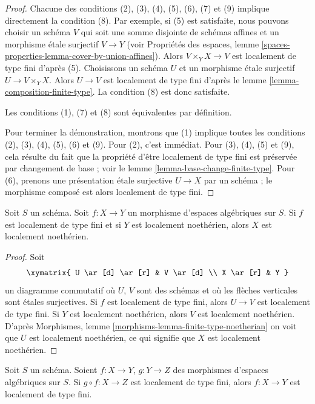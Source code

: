 \begin{proof}
Chacune des conditions (2), (3), (4), (5), (6), (7) et (9)
implique directement la condition (8). Par exemple, si
(5) est satisfaite, nous pouvons choisir un schéma $V$ qui soit une somme
disjointe de schémas affines et un morphisme étale surjectif $V \to Y$
(voir Propriétés des espaces, lemme
\ref{spaces-properties-lemma-cover-by-union-affines}).
Alors $V \times_Y X \to V$ est localement de type fini d'après (5).
Choisissons un schéma $U$ et un morphisme étale surjectif
$U \to V \times_Y X$. Alors $U \to V$ est localement de type
fini d'après le lemme \ref{lemma-composition-finite-type}.
La condition (8) est donc satisfaite.

\medskip\noindent
Les conditions (1), (7) et (8) sont équivalentes par définition.

\medskip\noindent
Pour terminer la démonstration, montrons que (1) implique toutes les conditions
(2), (3), (4), (5), (6) et (9). Pour (2), c'est immédiat.
Pour (3), (4), (5) et (9), cela résulte du fait que la propriété d'être
localement de type fini est préservée par changement de base ; voir le
lemme \ref{lemma-base-change-finite-type}.
Pour (6), prenons une présentation étale surjective $U \to X$ par un schéma ; le morphisme composé est alors localement de type fini.
\end{proof}

\begin{lemma}
\label{lemma-locally-finite-type-locally-noetherian}
Soit $S$ un schéma.
Soit $f : X \to Y$ un morphisme d'espaces algébriques sur $S$.
Si $f$ est localement de type fini et si $Y$ est localement noethérien,
alors $X$ est localement noethérien.
\end{lemma}

\begin{proof}
Soit
$$
\xymatrix{
U \ar[d] \ar[r] & V \ar[d] \\
X \ar[r] & Y
}
$$
un diagramme commutatif où $U$, $V$ sont des schémas et où les flèches verticales
sont étales surjectives. Si $f$ est localement de type fini, alors
$U \to V$ est localement de type fini. Si $Y$ est localement noethérien, alors
$V$ est localement noethérien. D'après
Morphismes, lemme \ref{morphisms-lemma-finite-type-noetherian}
on voit que $U$ est localement noethérien, ce qui signifie que $X$ est localement
noethérien.
\end{proof}

\begin{lemma}
\label{lemma-permanence-finite-type}
Soit $S$ un schéma.
Soient $f : X \to Y$, $g : Y \to Z$ des morphismes d'espaces algébriques sur $S$.
Si $g \circ f : X \to Z$ est localement de type fini, alors $f : X \to Y$
est localement de type fini.
\end{lemma}

